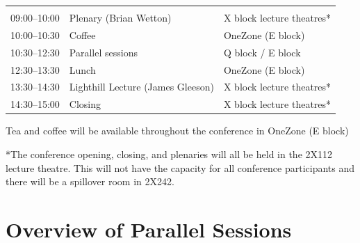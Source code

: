 \documentclass[12pt,a4paper]{article}
\begin{document}
\begin{tabularx}{\linewidth}{P{20mm}YP{50mm}}
  \\
  09:00--10:00 & Plenary (Brian Wetton) & X block lecture theatres*\\
  10:00--10:30 & Coffee & OneZone (E block) \\
  10:30--12:30 & Parallel sessions & Q block / E block\\
  12:30--13:30 & Lunch & OneZone (E block)\\
  13:30--14:30 & Lighthill Lecture (James Gleeson) & X block lecture theatres*\\
  14:30--15:00 & Closing & X block lecture theatres*
\end{tabularx}

Tea and coffee will be available throughout the conference in OneZone (E block)

*The conference opening, closing, and plenaries will all be held in the 2X112 lecture theatre. This will not have the capacity for all conference participants and there will be a spillover room in 2X242.

\section{Overview of Parallel Sessions}
\end{document}
